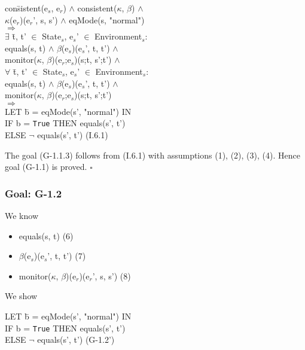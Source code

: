 \documentclass[conference]{IEEEtran}
\begin{document}
\begin{tabbing}
con\=sistent(e$_s$, e$_r$) $\wedge$ consistent($\kappa$, $\beta$) $\wedge$
\\\> \textlbrackdbl $\kappa$\textrbrackdbl(e$_r$)(e$_r$', s, s') $\wedge$ eqMode(s, "normal")
\\$\Rightarrow$
\\\>$\exists$ \=t, t' $\in$ State$_s$, e$_s$' $\in$ Environment$_s$: 
\\\>\>equals(s, t) $\wedge$ \textlbrackdbl $\beta$\textrbrackdbl(e$_s$)(e$_s$', t, t') $\wedge$ 
\\\>\>monitor($\kappa$, $\beta$)(e$_r$;e$_s$)(s;t, s';t')
$\wedge$
\\\>$\forall$ \=t, t' $\in$ State$_s$, e$_s$' $\in$ Environment$_s$: 
\\\>\>equals(s, t) $\wedge$ \textlbrackdbl $\beta$\textrbrackdbl(e$_s$)(e$_s$', t, t') $\wedge$ 
\\\>\>monitor($\kappa$, $\beta$)(e$_r$;e$_s$)(s;t, s';t')
\\\>$\Rightarrow$ \=
\\\> LET \=b = eqMode(s', "normal") IN
\\\>\>IF b = \texttt{True} THEN equals(s', t') 
\\\>\>ELSE $\neg$ equals(s', t')  \hspace*{2cm} (I.6.1)
\end{tabbing}

\noindent The goal (G-1.1.3) follows from (I.6.1) with assumptions (1), (2), (3), (4). Hence goal (G-1.1) is proved. $\square$

\subsubsection*{Goal: G-1.2}

\noindent We know

\begin{itemize}
\item equals(s, t)  \hspace*{3cm} (6)
\item \textlbrackdbl $\beta$\textrbrackdbl(e$_s$)(e$_s$', t, t')  \hspace*{2.2cm} (7)
\item monitor($\kappa$, $\beta$)(e$_r$)(e$_r$', s, s')  \hspace*{0.9cm} (8)
\end{itemize}

\noindent We show
\begin{center}
\begin{tabbing}
LET \=b = eqMode(s', "normal") IN
\\\>IF b = \texttt{True} THEN equals(s', t') 
\\\>ELSE $\neg$ equals(s', t')
 \hspace*{2cm} (G-1.2')
 \end{tabbing}
\end{center}
\end{document}
